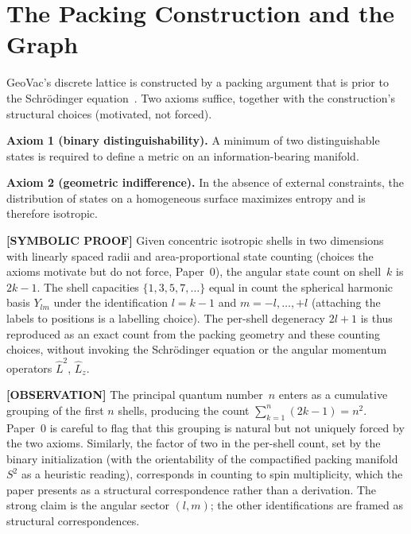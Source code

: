 \documentclass[aps,pra,twocolumn,superscriptaddress,longbibliography]{revtex4-2}
\begin{document}
\section{The Packing Construction and the Graph}
\label{sec:packing}

GeoVac's discrete lattice is constructed by a packing argument that is
prior to the Schr\"odinger equation~\cite{loutey_paper0}.  Two axioms
suffice, together with the construction's structural choices
(motivated, not forced).

\medskip
\noindent\textbf{Axiom 1 (binary distinguishability).}  A minimum of
two distinguishable states is required to define a metric on an
information-bearing manifold.

\medskip
\noindent\textbf{Axiom 2 (geometric indifference).}  In the absence of
external constraints, the distribution of states on a homogeneous
surface maximizes entropy and is therefore isotropic.

\medskip

\textbf{[SYMBOLIC PROOF]} Given concentric isotropic shells in two dimensions with linearly
spaced radii and area-proportional state counting (choices the axioms
motivate but do not force, Paper~0), the angular state count on
shell~$k$ is $2k - 1$.
The shell capacities $\{1, 3, 5, 7, \ldots\}$ equal in count the
spherical harmonic basis $Y_{lm}$ under the identification $l = k - 1$
and $m = -l, \ldots, +l$ (attaching the labels to positions is a
labelling choice).  The per-shell degeneracy $2l + 1$ is thus
reproduced as an exact count from the packing geometry and these
counting choices, without invoking the Schr\"odinger equation or the
angular momentum operators $\hat{L}^2$, $\hat{L}_z$.

\textbf{[OBSERVATION]} The principal quantum number~$n$ enters as a cumulative grouping of
the first $n$ shells, producing the count
$\sum_{k=1}^{n} (2k - 1) = n^2$.  Paper~0 is careful to flag that this
grouping is natural but not uniquely forced by the two axioms.
Similarly, the factor of two in the per-shell count, set by the binary
initialization (with the orientability of the compactified packing
manifold $S^2$ as a heuristic reading), corresponds in counting to spin
multiplicity, which the paper presents as a structural correspondence
rather than a derivation.  The strong claim is the angular sector $(l, m)$; the
other identifications are framed as structural correspondences.
\end{document}
